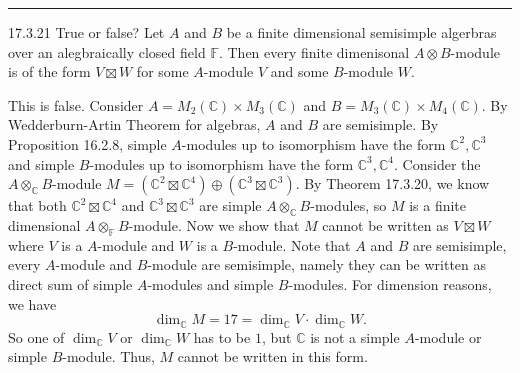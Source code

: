 \documentclass[a4paper, 12pt]{article}
\begin{document}
\noindent\rule{7in}{2.8pt}
\begin{problem}{17.3.21}
True or false? Let \(A\) and \(B\) be a finite dimensional semisimple algerbras over an alegbraically closed field \(\mathbb{F}\). Then every finite dimenisonal \(A\otimes B\)-module 
is of the form \(V\boxtimes W\) for some \(A\)-module \(V\) and some \(B\)-module \(W\).
\end{problem}
\begin{solution}
This is false. Consider \(A=M_2(\mathbb{C})\times M_3(\mathbb{C})\) and \(B=M_3(\mathbb{C})\times M_4(\mathbb{C})\). By Wedderburn-Artin Theorem for algebras, \(A\) and \(B\) are semisimple. By 
Proposition 16.2.8, simple \(A\)-modules up to isomorphism have the form \(\mathbb{C}^2, \mathbb{C}^3\) and simple \(B\)-modules up to isomorphism have the form \(\mathbb{C}^3, \mathbb{C}^4\). Consider the 
\(A\otimes_\mathbb{C} B\)-module \(M=(\mathbb{C}^2\boxtimes \mathbb{C}^4)\oplus (\mathbb{C}^3\boxtimes \mathbb{C}^3)\). By Theorem 17.3.20, we know that 
both \(\mathbb{C}^2\boxtimes \mathbb{C}^4\) and \(\mathbb{C}^3\boxtimes \mathbb{C}^3\) are simple \(A\otimes_\mathbb{C}B\)-modules, so \(M\) is a finite dimensional \(A\otimes_\mathbb{F}B\)-module. Now we show that 
\(M\) cannot be written as \(V\boxtimes W\) where \(V\) is a \(A\)-module and \(W\) is a \(B\)-module. Note that \(A\) and \(B\) are semisimple,  every \(A\)-module and \(B\)-module are semisimple, namely they can be written as 
direct sum of simple \(A\)-modules and simple \(B\)-modules. For dimension reasons, we have 
\[\dim_\mathbb{C}M=17=\dim_\mathbb{C}V\cdot \dim_\mathbb{C}W.\]
So one of \(\dim_\mathbb{C}V\) or \(\dim_\mathbb{C}W\) has to be \(1\), but \(\mathbb{C}\) is not a simple \(A\)-module or simple \(B\)-module. Thus, \(M\) cannot be written in this form. 
\end{solution}
\end{document}
